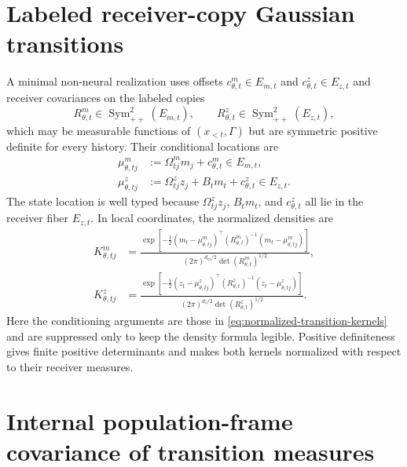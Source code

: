 \section{Labeled receiver-copy Gaussian transitions}

A minimal non-neural realization uses offsets $c_{\theta,t}^m\in E_{m,t}$ and $c_{\theta,t}^z\in E_{z,t}$ and receiver covariances on the labeled copies
\begin{equation}
R_{\theta,t}^m\in\operatorname{Sym}_{++}^2(E_{m,t}),
\qquad
R_{\theta,t}^z\in\operatorname{Sym}_{++}^2(E_{z,t}),
\label{eq:receiver-spd-transition-covariances}
\end{equation}
which may be measurable functions of $(x_{<t},\Gamma)$ but are symmetric positive definite for every history.  Their conditional locations are
\begin{equation}
\begin{aligned}
\mu^m_{\theta,tj}
&:=\Omega^m_{tj}m_j+c_{\theta,t}^m
\in E_{m,t},\\
\mu^z_{\theta,tj}
&:=\Omega^z_{tj}z_j+B_tm_t+c_{\theta,t}^z
\in E_{z,t}.
\end{aligned}
\label{eq:typed-gaussian-transition-locations}
\end{equation}
The state location is well typed because $\Omega^z_{tj}z_j$, $B_tm_t$, and $c_{\theta,t}^z$ all lie in the receiver fiber $E_{z,t}$.  In local coordinates, the normalized densities are
\begin{equation}
\begin{aligned}
K^m_{\theta,tj}
&=\frac{\exp\left[-\tfrac12
(m_t-\mu^m_{\theta,tj})^\top
(R_{\theta,t}^m)^{-1}
(m_t-\mu^m_{\theta,tj})\right]}
{(2\pi)^{d_m/2}\det(R_{\theta,t}^m)^{1/2}},\\
K^z_{\theta,tj}
&=\frac{\exp\left[-\tfrac12
(z_t-\mu^z_{\theta,tj})^\top
(R_{\theta,t}^z)^{-1}
(z_t-\mu^z_{\theta,tj})\right]}
{(2\pi)^{d_z/2}\det(R_{\theta,t}^z)^{1/2}}.
\end{aligned}
\label{eq:normalized-gaussian-transition-densities}
\end{equation}
Here the conditioning arguments are those in \cref{eq:normalized-transition-kernels} and are suppressed only to keep the density formula legible.  Positive definiteness gives finite positive determinants and makes both kernels normalized with respect to their receiver measures.

\section{Internal population-frame covariance of transition measures}

